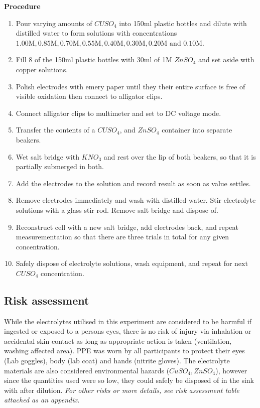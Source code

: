 \documentclass[11pt,a4paper]{article}
\begin{document}
\textbf{Procedure}
\small
\begin{enumerate}
	\item Pour varying amounts of $CUSO_4$ into 150ml plastic bottles and dilute with distilled water to form solutions with concentrations $1.00\textrm{M}, 0.85\textrm{M}, 0.70\textrm{M}, 0.55\textrm{M}, 0.40\textrm{M}, 0.30\textrm{M}, 0.20\textrm{M and } 0.10\textrm{M}$.
	
	\item Fill 8 of the 150ml plastic bottles with 30ml of 1M $ZnSO_4$ and set aside with copper solutions. 
	
	\item Polish electrodes with emery paper until they their entire surface is free of visible oxidation then connect to alligator clips.
	
	\item Connect alligator clips to multimeter and set to DC voltage mode.
	
	\item Transfer the contents of a $CUSO_4$, and $ZnSO_4$ container into separate beakers.
	
	\item Wet salt bridge with $KNO_3$ and rest over the lip of both beakers, so that it is partially submerged in both. 
	
	\item Add the electrodes to the solution and record result as soon as value settles.
	
	\item Remove electrodes immediately and wash with distilled water. Stir electrolyte solutions with a glass stir rod. Remove salt bridge and dispose of.
	
	\item Reconstruct cell with a new salt bridge, add electrodes back, and repeat measurementation so that there are three trials in total for any given concentration.
	
	\item Safely dispose of electrolyte solutions, wash equipment, and repeat for next $CUSO_4$ concentration.
\end{enumerate}

\subsection{Risk assessment}
While the electrolytes utilised in this experiment are considered to be harmful if ingested or exposed to a persons eyes, there is no risk of injury via inhalation or accidental skin contact as long as appropriate action is taken (ventilation, washing affected area). PPE was worn by all participants to protect their eyes (Lab goggles), body (lab coat) and hands (nitrite gloves). The electrolyte materials are also considered environmental hazards ($CuSO_4, ZnSO_4$), however since the quantities used were so low, they could safely be disposed of in the sink with after dilution.
\textit{For other risks or more details, see risk assessment table attached as an appendix.}
\end{document}
